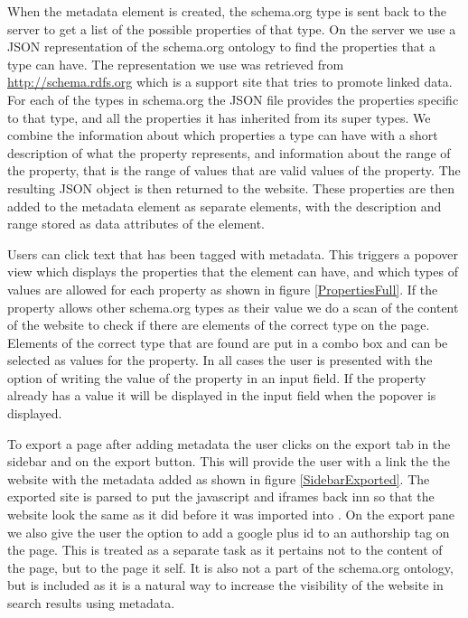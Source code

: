 When the metadata element is created,
the schema.org type is sent back to the server to get a list of the possible properties of that type.
On the server we use a JSON representation of the schema.org ontology to find the properties that a type can have.
The representation we use was retrieved from \url{http://schema.rdfs.org} which is a support site that tries to
promote linked data.
For each of the types in schema.org the JSON file provides the properties specific to that type,
and all the properties it has inherited from its super types.
We combine the information about which properties a type can have with a short description of what the property represents,
and information about the range of the property, that is the range of values that are valid values of the property.
The resulting JSON object is then returned to the website.
These properties are then added to the metadata element as separate elements,
with the description and range stored as data attributes of the element.

Users can click text that has been tagged with metadata.
This triggers a popover view which displays the properties that the element can have,
and which types of values are allowed for each property as shown in figure \ref{PropertiesFull}.
If the property allows other schema.org types as their value we do a scan of the content of the website to check if
there are elements of the correct type on the page.
Elements of the correct type that are found are put in a combo box and can be selected as values for the property.
In all cases the user is presented with the option of writing the value of the property in an input field.
If the property already has a value it will be displayed in the input field when the popover is displayed.

To export a page after adding metadata the user clicks on the export tab in the sidebar and on the export button.
This will provide the user with a link the the website with the metadata added as shown in figure \ref{SidebarExported}.
The exported site is parsed to put the javascript and iframes back inn so that the website look the same as it did
before it was imported into \theartefact.
On the export pane we also give the user the option to add a google plus id to an authorship tag on the page.
This is treated as a separate task as it pertains not to the content of the page, but to the page it self.
It is also not a part of the schema.org ontology, but is included as it is a natural way to increase the visibility of
the website in search results using metadata.



